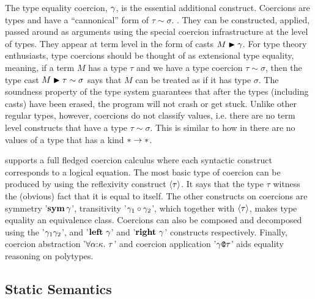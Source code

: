 \documentclass[manuscript,screen,nonacm]{acmart}
\begin{document}
The type equality coercion, $\gamma$, is the essential additional construct. Coercions are types and have a ``cannonical'' form of $\tau\sim\sigma$. . They can be constructed, applied, passed around as arguments using the special coercion infrastructure at the level of types. They appear at term level in the form of casts $M\mathrel{\blacktriangleright}\gamma$. For type theory enthusiasts, type coercions should be thought of as extensional type equality, meaning, if a term $M$ has a type $\tau$ and we have a type coercion $\tau\sim\sigma$, then the type cast $M\mathrel{\blacktriangleright}\tau\sim\sigma$ says that $M$ can be treated as if it has type $\sigma$. The soundness property of the type system guarantees that after the types (including casts) have been erased, the program will not crash or get stuck. Unlike other regular types, however, coercions do not classify values, i.e. there are no term level constructs that have a type $\tau\sim\sigma$. This is similar to how in \SFw there are no values of a type that has a kind $\ast\to\ast$.

\SFC supports a full fledged coercion calculus where each syntactic construct corresponds to a logical equation. The most basic type of coercion can be produced by using the reflexivity construct $\langle\tau\rangle$. It says that the type $\tau$ witness the (obvious) fact that it is equal to itself. The other constructs on coercions are symmetry '$\textbf{sym}\,{\gamma}$', transitivity '$\gamma_1 \circ \gamma_2$', which together with $\langle\tau\rangle$, makes type equality an equivalence class. Coercions can also be composed and decomposed using the '$\gamma_1\gamma_2$', and '$\textbf{left}~\gamma$' and '$\textbf{right}~\gamma$' constructs respectively. Finally, coercion abstraction '$\forall\alpha{:}\kappa.~\tau$' and coercion application '$\gamma\texttt{@}\tau$' aids equality reasoning on polytypes.

\subsection{Static Semantics}

\newcommand\TCast{
  \ib{\irule[\trule{cast}]
    {\Typing \TEnv {\Tm} {\tau}}
    {\CoKinding \TEnv \Co {\tau \sim \sigma}};
    {\Typing \TEnv {\Cast \Tm \Co} {\sigma}}
  }
}

\newcommand\KReflCo{
  \ib{\irule[\trule{co-refl}]
    {\TyKinding \TEnv \tau \kappa};
    {\CoKinding \TEnv {\refl \tau} {\tau \sim \tau}}
  }
}

\newcommand\KSymCo{
  \ib{\irule[\trule{co-sym}]
    {\CoKinding \TEnv \Co {\tau \sim \sigma}};
    {\CoKinding \TEnv {\Sym \Co} {\sigma \sim \tau}}
  }
}
\end{document}
